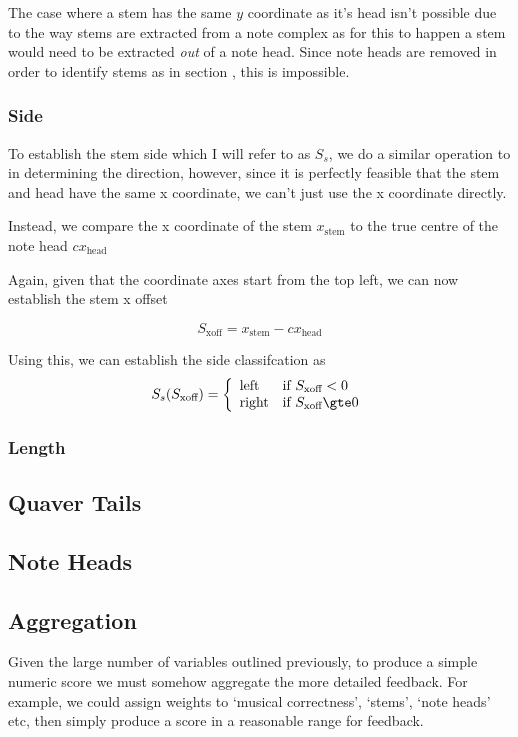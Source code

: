 The case where a stem has the same $y$ coordinate as it's head isn't possible due to the way stems are extracted from a note complex as for this to happen a stem would need to be extracted \emph{out} of a note head. Since note heads are removed in order to identify stems as in section , this is impossible.

\subsubsection{Side}
To establish the stem side which I will refer to as $S_s$, we do a similar operation to in determining the direction, however, since it is perfectly feasible that the stem and head have the same x coordinate, we can't just use the x coordinate directly.

Instead, we compare the x coordinate of the stem $x_{\text{stem}}$ to the true centre  of the note head $cx_{\text{head}}$

Again, given that the coordinate axes start from the top left, we can now establish the stem x offset

$$
S_\text{xoff} = x_{\text{stem}} - cx_{\text{head}}
$$

Using this, we can establish the side classifcation as
$$
S_{s} (S_\text{xoff}) =
\left\{
	\begin{array}{ll}
		\text{left}   & \mbox{if } S_\text{xoff} < 0 \\
		\text{right}  & \mbox{if } S_\text{xoff} \gte 0
	\end{array}
\right.
$$


\subsubsection{Length}

\subsection{Quaver Tails}

\subsection{Note Heads}

\subsection{Aggregation}
Given the large number of variables outlined previously, to produce a simple numeric score we must somehow aggregate the more detailed feedback. For example, we could assign weights to `musical correctness', `stems', `note heads' etc, then simply produce a score in a reasonable range for feedback.